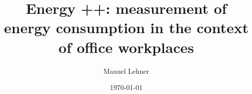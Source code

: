 \documentclass[
    numbers=noenddot,
    parskip=half-,
    fontsize=12pt,
    paper=a4,
    oneside,
    titlepage,
    bibliography=totoc,
    chapterprefix=false,
]{scrbook}
\title{Energy ++: measurement of energy consumption in the context of office workplaces}
\author{Manuel Lehner}
\date{\today}
\begin{document}
\frontmatter
%


\tableofcontents
\newpage


\newpage


\newpage

\thispagestyle{empty}
\cleardoublepage
\listoffigures
\newpage

\thispagestyle{empty}
\cleardoublepage
\listoftables
\newpage

\mainmatter





\printglossary[type=\acronymtype]

\printglossary

\begin{appendices}
    
\end{appendices}
\newpage


\backmatter

\printbibliography


\end{document}
